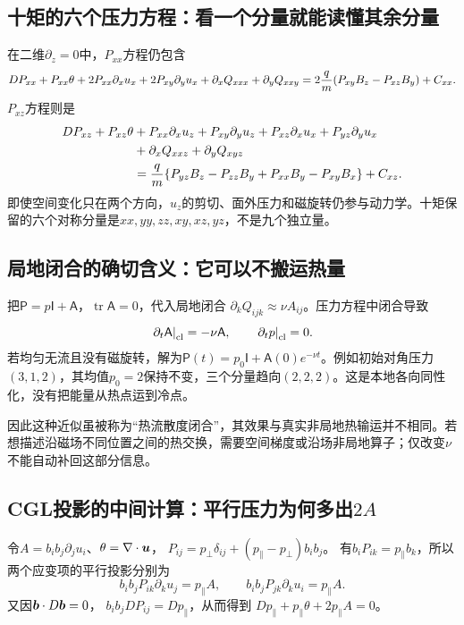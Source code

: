 \documentclass[UTF8,a4paper,11pt,openany,fontset=fandol]{ctexbook}
\begin{document}
\subsection{十矩的六个压力方程：看一个分量就能读懂其余分量}
在二维$\partial_z=0$中，$P_{xx}$方程仍包含
\begin{align}
 DP_{xx}+P_{xx}\theta
 +2P_{xx}\partial_xu_x+2P_{xy}\partial_yu_x
 +\partial_xQ_{xxx}+\partial_yQ_{xxy}
 =2{q\over m}(P_{xy}B_z-P_{xz}B_y)+C_{xx}.
\end{align}
$P_{xz}$方程则是
\begin{align}
 DP_{xz}+P_{xz}\theta
 &+P_{xx}\partial_xu_z+P_{xy}\partial_yu_z
 +P_{xz}\partial_xu_x+P_{yz}\partial_yu_x\\
 &+\partial_xQ_{xxz}+\partial_yQ_{xyz}\nonumber\\
 &={q\over m}\{P_{yz}B_z-P_{zz}B_y
                  +P_{xx}B_y-P_{xy}B_x\}+C_{xz}.\nonumber
\end{align}
即使空间变化只在两个方向，$u_z$的剪切、面外压力和磁旋转仍参与动力学。十矩保留的六个对称分量是$xx,yy,zz,xy,xz,yz$，不是九个独立量。

\subsection{局地闭合的确切含义：它可以不搬运热量}
把$\mathsf P=p\mathsf I+\mathsf A$，$\operatorname{tr}\mathsf A=0$，代入局地闭合
$\partial_kQ_{ijk}\approx\nu A_{ij}$。压力方程中闭合导致
\begin{equation}
 \left.\partial_t\mathsf A\right|_{\rm cl}=-\nu\mathsf A,\qquad
 \left.\partial_tp\right|_{\rm cl}=0.
\end{equation}
若均匀无流且没有磁旋转，解为$\mathsf P(t)=p_0\mathsf I+\mathsf A(0)e^{-\nu t}$。例如初始对角压力$(3,1,2)$，其均值$p_0=2$保持不变，三个分量趋向$(2,2,2)$。这是本地各向同性化，没有把能量从热点运到冷点。

因此这种近似虽被称为“热流散度闭合”，其效果与真实非局地热输运并不相同。若想描述沿磁场不同位置之间的热交换，需要空间梯度或沿场非局地算子；仅改变$\nu$不能自动补回这部分信息。\citep{Wang2015,Ng2020,Closure2026}

\subsection{CGL投影的中间计算：平行压力为何多出$2A$}
令$A=b_ib_j\partial_ju_i$、$\theta=\nabla\cdot\bm{u}$，
$P_{ij}=p_\perp\delta_{ij}+(p_\parallel-p_\perp)b_ib_j$。
有$b_iP_{ik}=p_\parallel b_k$，所以两个应变项的平行投影分别为
\begin{equation}
 b_ib_jP_{ik}\partial_ku_j=p_\parallel A,\qquad
 b_ib_jP_{jk}\partial_ku_i=p_\parallel A.
\end{equation}
又因$\bm{b}\cdot D\bm{b}=0$，
$b_ib_jDP_{ij}=Dp_\parallel$，从而得到
$Dp_\parallel+p_\parallel\theta+2p_\parallel A=0$。
\end{document}
